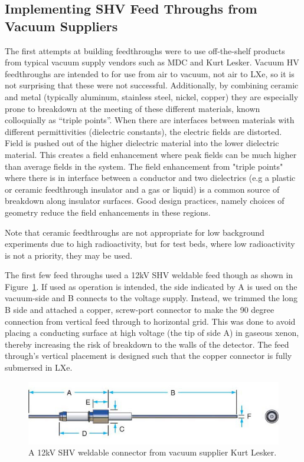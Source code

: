 \subsection{Implementing SHV Feed Throughs from Vacuum Suppliers}
The first attempts at building feedthroughs were to use off-the-shelf products from typical vacuum supply vendors such as MDC and Kurt Lesker. Vacuum \ac{HV} feedthroughs are intended to for use from air to vacuum, not air to \ac{LXe}, so it is not surprising that these were not successful. Additionally, by combining ceramic and metal (typically aluminum, stainless steel, nickel, copper) they are especially prone to breakdown at the meeting of these different materials, known colloquially as ``triple points''. When there are interfaces between materials with different permittivities (dielectric constants), the electric fields are distorted.  Field is pushed out of the higher dielectric material into the lower dielectric material. This creates a field enhancement where peak fields can be much higher than average fields in the system. The field enhancement from "triple points" where there is in interface between a conductor and two dielectrics (e.g a plastic or ceramic feedthrough insulator and a gas or liquid) is a common source of breakdown along insulator surfaces. Good design practices, namely choices of geometry reduce the field enhancements in these regions.


Note that ceramic feedthroughs are not appropriate for low background experiments due to high radioactivity, but for test beds, where low radioactivity is not a priority, they may be used.

The first few feed throughs used a 12kV \ac{SHV} weldable feed though as shown in Figure~\ref{fig:12kV-SHV}. If used as operation is intended, the side indicated by A is used on the vacuum-side and B connects to the voltage supply. Instead, we trimmed the long B side and attached a copper, screw-port connector to make the 90 degree connection from vertical feed through to horizontal grid. This was done to avoid placing a conducting surface at high voltage (the tip of side A) in gaseous xenon, thereby increasing the risk of breakdown to the walls of the detector. The feed through's vertical placement is designed such that the copper connector is fully submersed in \ac{LXe}.

 
\begin{figure}[htbp]
\begin{center}
\includegraphics[width=5in]{figures/testbed/12kV-SHV.jpg}
\caption{A 12kV SHV weldable connector from vacuum supplier Kurt Lesker.}
\label{fig:12kV-SHV}
\end{center}
\end{figure}


